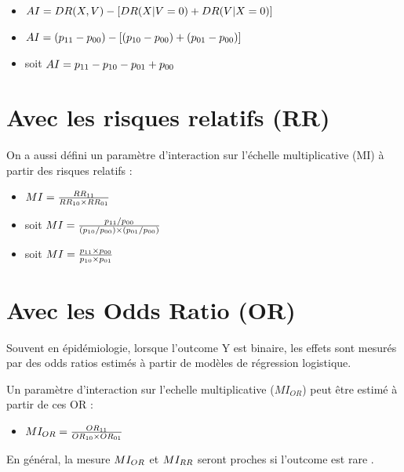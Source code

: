 \documentclass[
]{book}
\providecommand{\tightlist}{%
  \setlength{\itemsep}{0pt}\setlength{\parskip}{0pt}}
\begin{document}
\begin{itemize}
\tightlist
\item
  \(\small AI = DR(X, V) - [DR(X|V=0) + DR(V|X=0)]\)
\item
  \(\small AI = (p_{11} - p_{00}) - [(p_{10} - p_{00}) + (p_{01} - p_{00})]\)
\item
  soit \(\small AI =p_{11} - p_{10} - p_{01} + p_{00}\)
\end{itemize}

\hypertarget{avec-les-risques-relatifs-rr}{%
\section{Avec les risques relatifs (RR)}\label{avec-les-risques-relatifs-rr}}

On a aussi défini un paramètre d'interaction sur l'échelle multiplicative (MI) à partir des risques relatifs \citet{vanderweele_tutorial_2014} :

\begin{itemize}
\tightlist
\item
  \(\small MI = \frac{RR_{11}}{RR_{10} \times RR_{01}}\)
\item
  soit \(\small MI = \frac{p_{11} / p_{00}}{(p_{10} / p_{00}) \times (p_{01} / p_{00})}\)
\item
  soit \(\small MI = \frac{p_{11} \times p_{00}}{p_{10} \times p_{01}}\)
\end{itemize}

\hypertarget{avec-les-odds-ratio-or}{%
\section{Avec les Odds Ratio (OR)}\label{avec-les-odds-ratio-or}}

Souvent en épidémiologie, lorsque l'outcome Y est binaire, les effets sont mesurés par des odds ratios estimés à partir de modèles de régression logistique.

Un paramètre d'interaction sur l'echelle multiplicative (\(MI_{OR}\)) peut être estimé à partir de ces OR \citet{vanderweele_tutorial_2014} :

\begin{itemize}
\tightlist
\item
  \(\small MI_{OR} = \frac{OR_{11}}{OR_{10} \times OR_{01}}\)
\end{itemize}

En général, la mesure \(\small MI_{OR}\) et \(\small MI_{RR}\) seront proches si l'outcome est rare \citet{vanderweele_tutorial_2014}.
\end{document}
